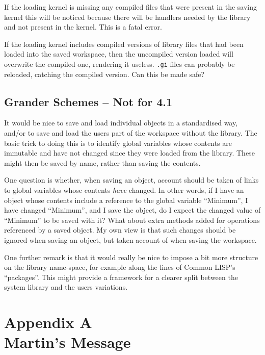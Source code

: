 \documentclass[11pt]{article}
\begin{document}
If the loading kernel is missing any compiled files that were present
in the saving kernel this will be noticed because there will be
handlers needed by the library and not present in the kernel. This is
a fatal error.

If the loading kernel includes compiled versions of library files that
had been loaded into the saved workspace, then the uncompiled version
loaded will overwrite the compiled one, rendering it useless. \verb|.gi|
files can probably be reloaded, catching the compiled version. Can
this be made safe?

\subsection{Grander Schemes -- Not for 4.1}

It would be nice to save and load individual objects in a standardised
way, and/or to save and load the users part of the workspace without
the library. The basic trick to doing this is to identify global
variables whose contents are immutable and have not changed since they
were loaded from the library. These might then be saved by name,
rather than saving the contents.

One question is whether, when saving an object, account should be
taken of links to global variables whose contents \emph{have}
changed. In other words, if I have an object whose contents include a
reference to the global variable ``Minimum'', I have changed
``Minimum'', and I save the object, do I expect the changed value of
``Minimum'' to be saved with it? What about extra methods added for
operations referenced by a saved object. My own view is that such
changes should be ignored when saving an object, but taken account of
when saving the workspace.

One further remark is that it would really be nice to impose a bit
more structure on the library name-space, for example along the lines
of Common LISP's ``packages''. This might provide a framework for a
clearer split between the system library and the users variations.

\section*{Appendix A\\ Martin's Message}
\end{document}
